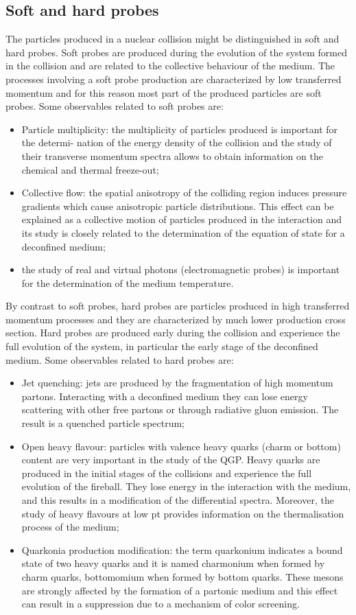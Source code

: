 \subsection{Soft and hard probes}
The particles produced in a nuclear collision might be distinguished in soft and hard probes.
Soft probes are produced during the evolution of the system formed in the collision and are related to the collective behaviour of the medium.
The processes involving a soft probe production are characterized by low transferred momentum and for this reason most part of the produced particles are soft probes.
Some observables related to soft probes are:
\begin{itemize}
    \item Particle multiplicity: the multiplicity of particles produced is important for the determi- nation of the energy density of the collision and the study of their transverse momentum spectra allows to obtain information on the chemical and thermal freeze-out;
    \item Collective flow: the spatial anisotropy of the colliding region induces pressure gradients which cause anisotropic particle distributions. This effect can be explained as a collective motion of particles produced in the interaction and its study is closely related to the determination of the equation of state for a deconfined medium;
    \item the study of real and virtual photons (electromagnetic probes) is important for the determination of the medium temperature.
\end{itemize}
By contrast to soft probes, hard probes are particles produced in high transferred momentum processes and they are characterized by much lower production cross section.
Hard probes are produced early during the collision and experience the full evolution of the system, in particular the early stage of the deconfined medium.
Some observables related to hard probes are:
\begin{itemize}
    \item Jet quenching: jets are produced by the fragmentation of high momentum partons. Interacting with a deconfined medium they can lose energy scattering with other free partons or through radiative gluon emission. The result is a quenched particle spectrum;
    \item Open heavy flavour: particles with valence heavy quarks (charm or bottom) content are very important in the study of the QGP.
    Heavy quarks are produced in the initial stages of the collisions and experience the full evolution of the fireball.
    They lose energy in the interaction with the medium, and this results in a modification of the differential spectra.
    Moreover, the study of heavy flavours at low pt provides information on the thermalisation process of the medium;
    \item Quarkonia production modification: the term quarkonium indicates a bound state of two heavy quarks and it is named charmonium when formed by charm quarks, bottomomium when formed by bottom quarks. These mesons are strongly affected by the formation of a partonic medium and this effect can result in a suppression due to a mechanism of color screening.
\end{itemize}

